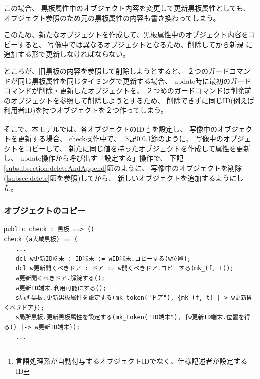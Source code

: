 \documentclass[a4paper,8pt]{jsarticle}
\begin{document}
この場合、
黒板属性中のオブジェクト内容を変更して更新黒板属性としても、
オブジェクト参照のため元の黒板属性の内容も書き換わってしまう。

このため、新たなオブジェクトを作成して、黒板属性中のオブジェクト内容をコピーすると、
写像中では異なるオブジェクトとなるため、削除してから新規
に追加する形で更新しなければならない。

ところが、旧黒板の内容を参照して削除しようとすると、
２つのガードコマンドが同じ黒板属性を同じタイミングで更新する場合、
update時に最初のガードコマンドが削除・更新したオブジェクトを、
２つめのガードコマンドは削除前のオブジェクトを参照して削除しようとするため、
削除できずに同じID(例えば利用者ID)を持つオブジェクトを２つ作ってしまう。

そこで、本モデルでは、各オブジェクトのID
\footnote{言語処理系が自動付与するオブジェクトIDでなく、仕様記述者が設定するID}
を設定し、
写像中のオブジェクトを更新する場合、
check操作中で、
下記\ref{subsubsection:copy}節のように、
写像中のオブジェクトをコピーして、
新たに同じ値を持ったオブジェクトを作成して属性を更新し、
update操作から呼び出す「設定する」操作で、
下記\ref{subsubsection:deleteAndAppend}節のように、
写像中のオブジェクトを削除(\ref{subsec:delete}節を参照)してから、
新しいオブジェクトを追加するようにした。

\subsubsection{オブジェクトのコピー}
\label{subsubsection:copy}
\begin{verbatim}
public check : 黒板 ==> ()
check (a大域黒板) == (
　　...
　　dcl w更新ID端末 : ID端末 := wID端末.コピーする(w位置);
　　dcl w更新開くべきドア : ドア := w開くべきドア.コピーする(mk_(f, t));
　　w更新開くべきドア.解錠する();
　　w更新ID端末.利用可能にする();
　　s局所黒板.更新黒板属性を設定する(mk_token("ドア"), {mk_(f, t) |-> w更新開くべきドア});
　　s局所黒板.更新黒板属性を設定する(mk_token("ID端末"), {w更新ID端末.位置を得る() |-> w更新ID端末});
　　...
\end{verbatim}
\end{document}
